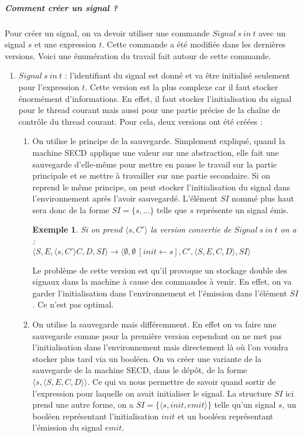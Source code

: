 \documentclass[10pt,a4paper]{report}
\newtheorem{ex}{Exemple}
\begin{document}
	\subparagraph{Comment créer un signal ?}
	Pour créer un signal, on va devoir utiliser une commande $Signal~s~in~t$ avec un signal $s$ et une expression $t$. Cette commande a été modifiée dans les dernières versions. Voici une énumération du travail fait autour de cette commande.
	\smallbreak
	\begin{enumerate}
		\item $Signal~s~in~t$ : l'identifiant du signal est donné et va être initialisé seulement pour l'expression $t$. Cette version est la plus complexe car il faut stocker énormément d'informations. En effet, il faut stocker l'initialisation du signal pour le thread courant mais aussi pour une partie précise de la chaîne de contrôle du thread courant. Pour cela, deux versions ont été créées :
		\begin{enumerate}
			\item On utilise le principe de la sauvegarde. Simplement expliqué, quand la machine SECD applique une valeur sur une abstraction, elle fait une sauvegarde d'elle-même pour mettre en pause le travail sur la partie principale et se mettre à travailler sur une partie secondaire. Si on reprend le même principe, on peut stocker l'initialisation du signal dans l'environnement après l'avoir sauvegardé. L'élément $SI$ nommé plus haut sera donc de la forme $SI=\{s,...\}$ telle que $s$ représente un signal émis.
			
			\begin{ex}
				Si on prend $\langle s,C'\rangle$ la version convertie de $Signal~s~in~t$ on a : 
				\\$\langle S,E,\langle s,C'\rangle C,D,SI\rangle \longrightarrow \langle \emptyset,\emptyset~[init \leftarrow s],C',\langle S,E,C,D\rangle,SI\rangle$  
			\end{ex}
			
			Le problème de cette version est qu'il provoque un stockage double des signaux dans la machine à cause des commandes à venir. En effet, on va garder l'initialisation dans l'environnement et l'émission dans l'élément $SI$. Ce n'est pas optimal.
			
			\item On utilise la sauvegarde mais différemment. En effet on va faire une sauvegarde comme pour la première version cependant on ne met pas l'initialisation dans l'environnement mais directement là où l'on voudra stocker plus tard via un booléen. On va créer une variante de la sauvegarde de la machine SECD, dans le dépôt, de la forme $\langle s,\langle S,E,C,D\rangle\rangle$. Ce qui va nous permettre de savoir quand sortir de l'expression pour laquelle on avait initialiser le signal. La structure $SI$ ici prend une autre forme, on a $SI=\{\langle s,init,emit\rangle\}$ telle qu'un signal $s$, un booléen représentant l'initialisation $init$ et un booléen représentant l'émission du signal $emit$.
			

\end{enumerate}
\end{enumerate}
\end{document}
